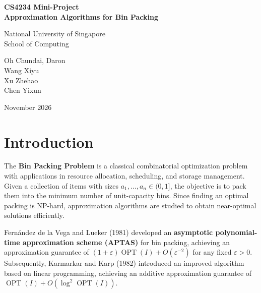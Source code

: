 \documentclass[11pt,a4paper,onecolumn]{article}
\theoremstyle{plain}
\theoremstyle{definition}
\theoremstyle{remark}
\DeclareMathOperator{\OPT}{OPT}
\begin{document}
\begin{titlepage}
    \centering

    \vspace*{3cm}

    {\Large\bfseries
    CS4234 Mini-Project\\[0.5cm]
    Approximation Algorithms for Bin Packing
    \par}

    \vspace{2cm}

    {\large
    National University of Singapore\\
    School of Computing
    \par}

    \vspace{2cm}

    {\normalsize
    Oh Chundai, Daron\\
    Wang Xiyu\\
    Xu Zhehao\\
    Chen Yixun
    \par}

    \vfill

    {\normalsize November 2026\par}

\end{titlepage}


\section{Introduction}

The \textbf{Bin Packing Problem} is a classical combinatorial
optimization problem with applications in resource allocation,
scheduling, and storage management. Given a collection of items
with sizes $a_1,\ldots,a_n \in (0,1]$, the objective is to pack
them into the minimum number of unit-capacity bins. Since
finding an optimal packing is NP-hard, approximation algorithms
are studied to obtain near-optimal solutions efficiently.

Fernández de la Vega and Lueker (1981)
\cite{fernandezdelavegaBinPackingCan1981} developed an
\textbf{asymptotic polynomial-time approximation scheme (APTAS)}
for bin packing, achieving an approximation guarantee of
$(1+\varepsilon)\OPT(I)+O(\varepsilon^{-2})$ for any fixed
$\varepsilon>0$. Subsequently, Karmarkar and Karp (1982)
\cite{karmarkarEfficientApproximationScheme1982}
introduced an improved algorithm based on linear programming,
achieving an additive approximation guarantee of
$\OPT(I)+O(\log^2\OPT(I))$.
\end{document}
